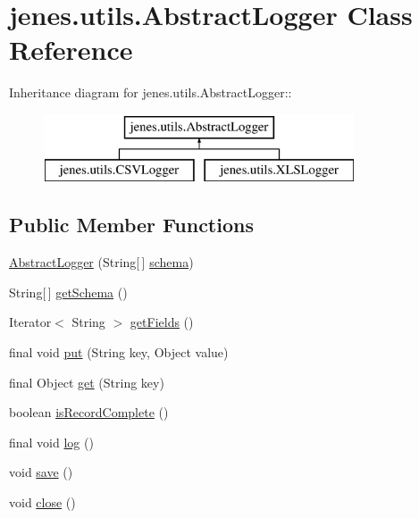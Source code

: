 \hypertarget{classjenes_1_1utils_1_1_abstract_logger}{
\section{jenes.utils.AbstractLogger Class Reference}
\label{classjenes_1_1utils_1_1_abstract_logger}
}
Inheritance diagram for jenes.utils.AbstractLogger::\begin{figure}[H]
\begin{center}
\leavevmode
\includegraphics[height=2cm]{classjenes_1_1utils_1_1_abstract_logger}
\end{center}
\end{figure}
\subsection*{Public Member Functions}
\begin{CompactItemize}
\item 
\hyperlink{classjenes_1_1utils_1_1_abstract_logger_357a64e024ede4da833b79455ba63644}{AbstractLogger} (String\mbox{[}$\,$\mbox{]} \hyperlink{classjenes_1_1utils_1_1_abstract_logger_3a2030876857a0512fae7e0ad400c570}{schema})
\item 
String\mbox{[}$\,$\mbox{]} \hyperlink{classjenes_1_1utils_1_1_abstract_logger_3f4dc79a211f8e01c621d42dec8d4de2}{getSchema} ()
\item 
Iterator$<$ String $>$ \hyperlink{classjenes_1_1utils_1_1_abstract_logger_e939c8578c5342d8f11ff61388ddfd80}{getFields} ()
\item 
final void \hyperlink{classjenes_1_1utils_1_1_abstract_logger_0f00b8fa60e88b7c2834be7cdf1fc07e}{put} (String key, Object value)
\item 
final Object \hyperlink{classjenes_1_1utils_1_1_abstract_logger_cceb0a183912b0ec7fc95554ab2e3001}{get} (String key)
\item 
boolean \hyperlink{classjenes_1_1utils_1_1_abstract_logger_f4f01e740a9332b8bb32817e01e7b030}{isRecordComplete} ()
\item 
final void \hyperlink{classjenes_1_1utils_1_1_abstract_logger_26e56f4617fbd249359186c90ec265ba}{log} ()
\item 
void \hyperlink{classjenes_1_1utils_1_1_abstract_logger_736fbff3759196a70dbf6618f10e8786}{save} ()
\item 
void \hyperlink{classjenes_1_1utils_1_1_abstract_logger_7d973cbb6b91f254a5430a8875898dbe}{close} ()
\end{CompactItemize}
